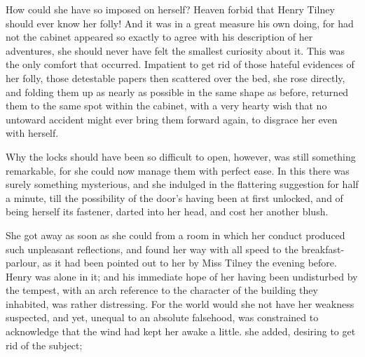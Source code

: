 How could she have so imposed on herself? Heaven forbid that Henry Tilney should ever know her folly! And it was in a great measure his own doing, for had not the cabinet appeared so exactly to agree with his description of her adventures, she should never have felt the smallest curiosity about it. This was the only comfort that occurred. Impatient to get rid of those hateful evidences of her folly, those detestable papers then scattered over the bed, she rose directly, and folding them up as nearly as possible in the same shape as before, returned them to the same spot within the cabinet, with a very hearty wish that no untoward accident might ever bring them forward again, to disgrace her even with herself.

Why the locks should have been so difficult to open, however, was still something remarkable, for she could now manage them with perfect ease. In this there was surely something mysterious, and she indulged in the flattering suggestion for half a minute, till the possibility of the door's having been at first unlocked, and of being herself its fastener, darted into her head, and cost her another blush.

She got away as soon as she could from a room in which her conduct produced such unpleasant reflections, and found her way with all speed to the breakfast-parlour, as it had been pointed out to her by Miss Tilney the evening before. Henry was alone in it; and his immediate hope of her having been undisturbed by the tempest, with an arch reference to the character of the building they inhabited, was rather distressing. For the world would she not have her weakness suspected, and yet, unequal to an absolute falsehood, was constrained to acknowledge that the wind had kept her awake a little.  she added, desiring to get rid of the subject; 




